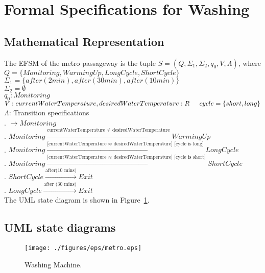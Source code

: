 \newpage
\section{Formal Specifications for Washing}

\subsection{Mathematical Representation}

\noindent The EFSM of the metro passageway is the tuple $S = (Q, \Sigma_1, \Sigma_2, q_0, V, \Lambda)$, where\\

\noindent $Q = \{Monitoring, Warming Up, Long Cycle, Short Cycle\}$\\
\noindent $\Sigma_1 = \{after(2min), after(30min), after(10min)\}$\\
\noindent $\Sigma_2 = \emptyset$\\
\noindent $q_0: Monitoring$\\
\noindent $V: currentWaterTemperature, desiredWaterTemperature: R \\
\indent cycle = \{short, long\}$\\
\noindent $\Lambda$: Transition specifications\\
. $\rightarrow Monitoring$\\
. $Monitoring \xrightarrow {\text {currentWaterTemperature $\neq$ desiredWaterTemperature}} Warming Up$\\
. $Monitoring \xrightarrow {\text {[currentWaterTemperature $\approx$ desiredWaterTemperature] [cycle is long]}} Long Cycle$\\
. $Monitoring \xrightarrow {\text {[currentWaterTemperature $\approx$ desiredWaterTemperature] [cycle is short]}} Short Cycle$\\
. $Short Cycle \xrightarrow {\text {after(10 mins)}} Exit$\\
. $Long Cycle \xrightarrow {\text {after (30 mins)}} Exit$\\

\noindent The UML state diagram is shown in Figure~\ref{fig:Washing}.

\newpage

\subsection{UML state diagrams}

\begin{figure}[h!]
	\centering
		\texttt{[image: ./figures/eps/metro.eps]}
		  \caption{Washing Machine.}
  \label{fig:Washing}
\end{figure}


